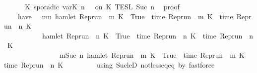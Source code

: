 \begin{isabellebody}
{\ \ \ \ {\isasymunion}\ {\isasymlbrakk}\ K\ sporadic\ {\isasymlparr}{\isasymtau}\isactrlsub v\isactrlsub a\isactrlsub r{\isacharparenleft}K{\isacharcomma}\ n{\isacharprime}{\isacharparenright}\ {\isasymoplus}\ {\isasymtau}{\isasymrparr}\ on\ K\ {\isasymrbrakk}\isactrlsub T\isactrlsub E\isactrlsub S\isactrlsub L\isactrlbsup {\isasymge}\ Suc\ n\isactrlesup {\isasymclose}\isanewline
\ \ proof\ {\isacharminus}\isanewline
\ \ \ \ have\ {\isasymopen}{\isacharbraceleft}\ {\isasymrho}{\isachardot}\ {\isasymexists}m{\isasymge}n{\isachardot}\ hamlet\ {\isacharparenleft}{\isacharparenleft}Rep{\isacharunderscore}run\ {\isasymrho}{\isacharparenright}\ m\ K\ {\isacharequal}\ True\ {\isasymand}\ time\ {\isacharparenleft}{\isacharparenleft}Rep{\isacharunderscore}run\ {\isasymrho}{\isacharparenright}\ m\ K\ {\isacharequal}\ time\ {\isacharparenleft}{\isacharparenleft}Rep{\isacharunderscore}run\ {\isasymrho}{\isacharparenright}\ n{\isacharprime}\ K{\isacharparenright}\ {\isacharplus}\ {\isasymtau}\ {\isacharbraceright}\isanewline
\ \ \ \ \ \ \ \ {\isacharequal}\ {\isacharbraceleft}\ {\isasymrho}{\isachardot}\ hamlet\ {\isacharparenleft}{\isacharparenleft}Rep{\isacharunderscore}run\ {\isasymrho}{\isacharparenright}\ n\ K\ {\isacharequal}\ True\ {\isasymand}\ time\ {\isacharparenleft}{\isacharparenleft}Rep{\isacharunderscore}run\ {\isasymrho}{\isacharparenright}\ n\ K\ {\isacharequal}\ time\ {\isacharparenleft}{\isacharparenleft}Rep{\isacharunderscore}run\ {\isasymrho}{\isacharparenright}\ n{\isacharprime}\ K{\isacharparenright}\ {\isacharplus}\ {\isasymtau}\isanewline
\ \ \ \ \ \ \ \ \ \ \ \ \ \ \ {\isasymor}\ {\isacharparenleft}{\isasymexists}m{\isasymge}Suc\ n{\isachardot}\ hamlet\ {\isacharparenleft}{\isacharparenleft}Rep{\isacharunderscore}run\ {\isasymrho}{\isacharparenright}\ m\ K\ {\isacharequal}\ True\ {\isasymand}\ time\ {\isacharparenleft}{\isacharparenleft}Rep{\isacharunderscore}run\ {\isasymrho}{\isacharparenright}\ m\ K\ {\isacharequal}\ time\ {\isacharparenleft}{\isacharparenleft}Rep{\isacharunderscore}run\ {\isasymrho}{\isacharparenright}\ n{\isacharprime}\ K{\isacharparenright}\ {\isacharplus}\ {\isasymtau}{\isacharparenright}\ {\isacharbraceright}{\isasymclose}\isanewline
\ \ \ \ \ \ using\ Suc{\isacharunderscore}leD\ not{\isacharunderscore}less{\isacharunderscore}eq{\isacharunderscore}eq\ by\ fastforce\isanewline
}
\end{isabellebody}
